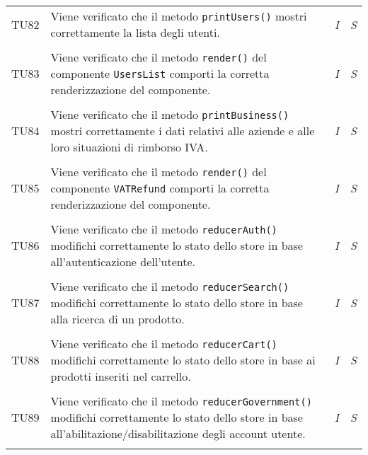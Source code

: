 \begin{longtable}{ >{\centering}p{} >{}p{}
				>{\centering}p{} >{\centering}p{}}
			\tabularnewline
			\hypertarget{TU82}{TU82} & Viene verificato che il metodo 
			\texttt{printUsers()} mostri correttamente la lista degli 
			utenti. & 
			\textit{I} & 
			\textit{S}\\
			
			\tabularnewline
			\hypertarget{TU83}{TU83} & Viene verificato che il metodo 
			\texttt{render()} del componente \texttt{UsersList} comporti la 
			corretta renderizzazione del componente. & 
			\textit{I} & 
			\textit{S}\\
			
			\tabularnewline
			\hypertarget{TU84}{TU84} & Viene verificato che il metodo 
			\texttt{printBusiness()} mostri correttamente i dati relativi 
			alle aziende e alle loro situazioni di rimborso IVA. & 
			\textit{I} & 
			\textit{S}\\

			\tabularnewline
			\hypertarget{TU85}{TU85} & Viene verificato che il metodo 
			\texttt{render()} del componente \texttt{VATRefund} comporti 
			la corretta renderizzazione del componente. & 
			\textit{I} & 
			\textit{S}\\
			
			\tabularnewline
			\hypertarget{TU86}{TU86} & Viene verificato che il metodo 
			\texttt{reducerAuth()} modifichi correttamente lo stato dello store 
			in base all'autenticazione dell'utente. & 
			\textit{I} & 
			\textit{S}\\
			
			\tabularnewline
			\hypertarget{TU87}{TU87} & Viene verificato che il metodo 
			\texttt{reducerSearch()} modifichi correttamente lo stato dello 
			store in base alla ricerca di un prodotto. & 
			\textit{I} & 
			\textit{S}\\
			
			\tabularnewline
			\hypertarget{TU88}{TU88} & Viene verificato che il metodo 
			\texttt{reducerCart()} modifichi correttamente lo stato dello store 
			in base ai prodotti inseriti nel carrello. & 
			\textit{I} & 
			\textit{S}\\
			
			\tabularnewline
			\hypertarget{TU89}{TU89} & Viene verificato che il metodo 
			\texttt{reducerGovernment()} modifichi correttamente lo stato dello 
			store in base all'abilitazione/disabilitazione degli account utente. & 
			\textit{I} & 
			\textit{S}\\
			

			\tabularnewline
		\end{longtable}

